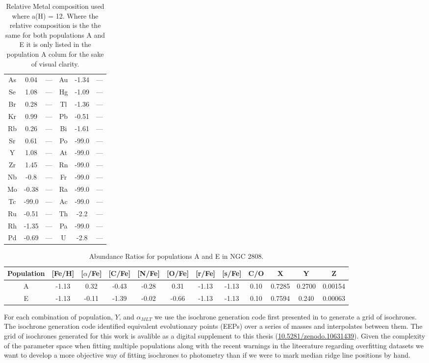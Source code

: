 \begin{table}
\begin{tabular}{c|cc||c|cc}
  As & 0.04 & --- & Au & -1.34 & --- \\
  Se & 1.08 & --- & Hg & -1.09 & --- \\
  Br & 0.28 & --- & Tl & -1.36 & --- \\
  Kr & 0.99 & --- & Pb & -0.51 & --- \\
  Rb & 0.26 & --- & Bi & -1.61 & --- \\
  Sr & 0.61 & --- & Po & -99.0 & --- \\
  Y & 1.08 & --- & At & -99.0 & --- \\
  Zr & 1.45 & --- & Rn & -99.0 & --- \\
  Nb & -0.8 & --- & Fr & -99.0 & --- \\
  Mo & -0.38 & --- & Ra & -99.0 & --- \\
  Tc & -99.0 & --- & Ac & -99.0 & --- \\
  Ru & -0.51 & --- & Th & -2.2 & --- \\
  Rh & -1.35 & --- & Pa & -99.0 & --- \\
  Pd & -0.69 & --- & U & -2.8 & --- \\
\end{tabular}
\caption{Relative Metal composition used where a(H) = 12. Where the relative composition is the the same for both populations A and E it is only listed in the population A colum for the sake of visual clarity.}
\label{tab:comp}
\end{table}

\begin{table}
  \small
\centering
\begin{tabular}{c|c c c c c c c c c c c}
  \hline
  Population & [Fe/H] & [$\alpha$/Fe] & [C/Fe] & [N/Fe] & [O/Fe] & [r/Fe] & [s/Fe] & C/O & X & Y & Z \\
  \hline
  \hline
  A & -1.13 & 0.32 & -0.43 & -0.28 & 0.31 & -1.13 & -1.13 & 0.10 & 0.7285 & 0.2700 & 0.00154 \\
  E & -1.13 & -0.11 & -1.39 & -0.02 & -0.66 & -1.13 & -1.13 & 0.10 & 0.7594 & 0.240 & 0.00063
\end{tabular}
\caption{Abundance Ratios for populations A and E in NGC 2808.}
\label{tab:simpleComp}
\end{table}

For each combination of population, $Y$, and $\alpha_{MLT}$ we use the
isochrone generation code first presented in \citet{Dotter2016} to generate a
grid of isochrones. The isochrone generation code identified equivalent
evolutionary points (EEPs) over a series of masses and interpolates between
them. The grid of isochrones generated for this work is avalible as a digital
supplement to this thesis (\href{https://zenodo.org/records/10631439}{10.5281/zenodo.10631439}). Given the complexity of the parameter space when
fitting multiple populations along with the recent warnings in the liteerature
regarding overfitting datasets \citep[e.g. ][]{Valle2022} we want to develop a
more objective way of fitting isochrones to photometry than if we were to mark
median ridge line positions by hand.

